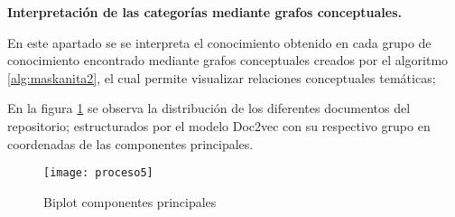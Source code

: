 


\textbf{Interpretación de las categorías  mediante grafos conceptuales.}


En este apartado se  se interpreta el conocimiento obtenido en cada grupo de conocimiento encontrado mediante grafos conceptuales creados por el algoritmo \ref{alg:maskanita2},
el cual permite visualizar relaciones conceptuales temáticas;

En la figura \ref{fig:procesocinco} se observa la distribución de los diferentes documentos del repositorio; estructurados por el modelo Doc2vec con su respectivo grupo en coordenadas de las componentes principales.


\begin{figure}[H]
\texttt{[image: proceso5]}
\caption{Biplot componentes principales}
\label{fig:procesocinco}
\end{figure}


